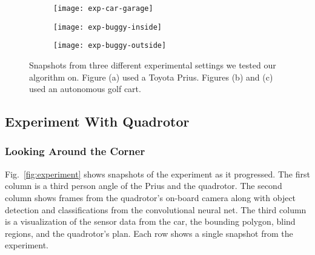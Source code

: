 \begin{figure}[t!]

    \centering

    \begin{subfigure}[t]{0.7\textwidth}

        \centering
        \texttt{[image: exp-car-garage]}
        \caption{}

        \label{fig:exp-car-garage}

    \end{subfigure}

    \vspace*{1mm}

    \begin{subfigure}[t]{0.7\textwidth}

        \centering
        \texttt{[image: exp-buggy-inside]}
        \caption{}

        \label{fig:exp-buggy-inside}

    \end{subfigure}

    \vspace*{1mm}

    \begin{subfigure}[t]{0.7\textwidth}

        \centering
        \texttt{[image: exp-buggy-outside]}
        \caption{}

        \label{fig:exp-buggy-outside}

    \end{subfigure}

    \caption{Snapshots from three different experimental settings we tested our
    algorithm on. Figure (a) used a Toyota Prius. Figures (b) and (c) used an
autonomous golf cart.}

    \label{fig:exps}

\end{figure}

\subsection{Experiment With Quadrotor}

\subsubsection{Looking Around the Corner}

Fig.~\ref{fig:experiment} shows snapshots of the experiment as it progressed.
The first column is a third person angle of the Prius and the quadrotor. The
second column shows frames from the quadrotor's on-board camera along with
object detection and classifications from the convolutional neural net. The
third column is a visualization of the sensor data from the car, the bounding
polygon, blind regions, and the quadrotor's plan. Each row shows a single
snapshot from the experiment.

